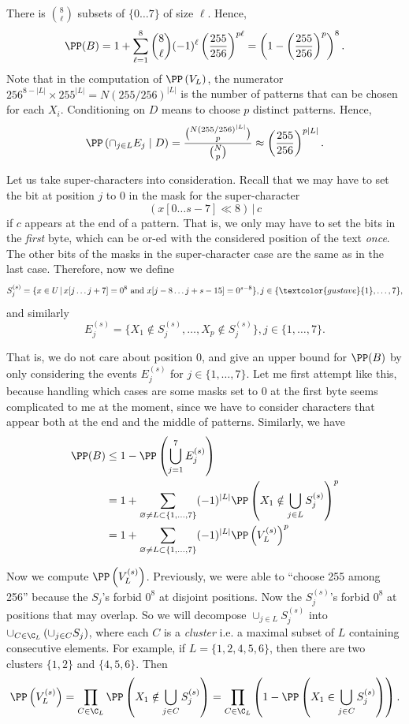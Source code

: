 There is $\binom{8}{\ell}$ subsets of $\{0\ldots 7\}$ of size $\ell$. Hence,
$$\PP(B)=1+\sum\limits_{\ell=1}^8 \binom{8}{\ell} (-1)^{\ell} \left(\dfrac{255}{256}\right)^{p\ell}=\left(1-\left(\dfrac{255}{256}\right)^p\right)^8.$$
Note that in the computation of $\PP\left(V_L\right)$, the numerator $256^{8-|L|}\times 255^{|L|}=N\left(255/256\right)^{|L|}$ is the number of patterns that can be chosen for each $X_i$. Conditioning on $D$ means to choose $p$ distinct patterns. Hence,
$$\PP\left(\cap_{j\in L} E_j\mid D\right) = \dfrac{\binom{N\left(255/256\right)^{|L|}}{p}}{\binom{N}{p}} \approx \left(\dfrac{255}{256}\right)^{p|L|}.$$

Let us take super-characters into consideration. Recall that we may have to set the bit at position $j$ to $0$ in the mask for the super-character
$$(x[0\ldots s-7]\ll 8) \,|\, c$$ if $c$ appears at the end of a pattern. That is, we only may have to set the bits in the \textit{first} byte, which can be or-ed with the considered position of the text \textit{once}. The other bits of the masks in the super-character case are the same as in the last case. Therefore, now we define
$$S^{(s)}_j=\{x\in U\,|\, x[j\ldots j+7] = 0^8 \text{ and } x[j-8\ldots j+s-15] = 0^{s-8}\}, j\in\{\textcolor{gustave}{1},\ldots, 7\},$$
and similarly
$$E^{(s)}_j=\{X_1\notin S^{(s)}_j,\ldots, X_p\notin S^{(s)}_j\}, j\in\{1,\ldots, 7\}.$$

That is, we do not care about position $0$, and give an upper bound for $\PP(B)$ by only considering the events $E^{(s)}_j$ for $j\in\{1,\ldots, 7\}$. Let me first attempt like this, because handling which cases are some masks set to $0$ at the first byte seems complicated to me at the moment, since we have to consider characters that appear both at the end and the middle of patterns. Similarly, we have
\begin{align*}
  \PP(B)
   & \le 1-\PP\left(\bigcup_{j=1}^7 E^{(s)}_j\right)                                                                       \\
   & = 1+ \sum_{\varnothing\ne L \subset \{1,\ldots, 7\}} (-1)^{|L|}\PP\left(X_1\notin \bigcup_{j\in L} S^{(s)}_j\right)^p \\
   & = 1+ \sum_{\varnothing\ne L \subset \{1,\ldots, 7\}} (-1)^{|L|}\PP\left(V^{(s)}_L\right)^p
\end{align*}

Now we compute $\PP\left(V^{(s)}_L\right)$. Previously, we were able to ``choose 255 among 256'' because the $S_j$'s forbid $0^8$ at disjoint positions. Now the $S^{(s)}_j$'s forbid $0^8$ at positions that may overlap. So we will decompose $\cup_{j\in L} S^{(s)}_j$ into $\cup_{C\in\C_L}\left(\cup_{j\in C} S_j\right)$, where each $C$ is a \textit{cluster} i.e. a maximal subset of $L$ containing consecutive elements. For example, if $L=\{1,2,4,5,6\}$, then there are two clusters $\{1,2\}$ and $\{4,5,6\}$. Then
$$\PP\left(V^{(s)}_L\right) = \prod_{C\in\C_L}\PP\left(X_1\notin \bigcup_{j\in C} S^{(s)}_j\right) = \prod_{C\in\C_L}\left(1-\PP\left(X_1\in \bigcup_{j\in C} S^{(s)}_j\right)\right).$$


